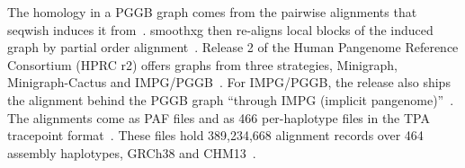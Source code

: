 The homology in a PGGB graph comes from the pairwise alignments that seqwish induces it from~\citep{Garrison2023seqwish,Garrison2024pggb}.
smoothxg then re-aligns local blocks of the induced graph by partial order alignment~\citep{Garrison2024pggb}.
Release 2 of the Human Pangenome Reference Consortium (HPRC r2) offers graphs from three strategies, Minigraph, Minigraph-Cactus and IMPG/PGGB~\citep{HPRC2026resources,Lucas2026hprc2}.
For IMPG/PGGB, the release also ships the alignment behind the PGGB graph ``through IMPG (implicit pangenome)''~\citep{HPRC2026resources}.
The alignments come as PAF files and as 466 per-haplotype files in the TPA tracepoint format~\citep{Guarracino2026tpa,Kaushan2026tracepoints}.
These files hold 389,234,668 alignment records over 464 assembly haplotypes, GRCh38 and CHM13~\citep{Schneider2017grch38,Nurk2022chm13}.

